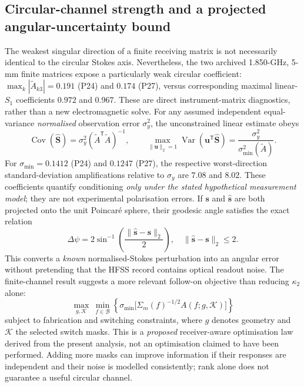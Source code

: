 \documentclass{ieeeaccess}
\begin{document}
\subsection{Circular-channel strength and a projected angular-uncertainty bound}
The weakest singular direction of a finite receiving matrix is not necessarily identical to the circular Stokes axis. Nevertheless, the two archived 1.850-GHz, 5-mm finite matrices expose a particularly weak circular coefficient: $\max_k |\widetilde A_{k3}|=0.191$ (P24) and $0.174$ (P27), versus corresponding maximal linear-$S_1$ coefficients $0.972$ and $0.967$. These are direct instrument-matrix diagnostics, rather than a new electromagnetic solve. For any assumed independent equal-variance \emph{normalised} observation error $\sigma_y^2$, the unconstrained linear estimate obeys
\begin{equation}
\operatorname{Cov}(\widehat {\boldsymbol S})=\sigma_y^2
(\widetilde A^{\mathsf T}\widetilde A)^{-1},\qquad
\max_{\|\boldsymbol u\|_2=1}\operatorname{Var}(\boldsymbol u^{\mathsf T}\widehat{\boldsymbol S})=
\frac{\sigma_y^2}{\sigma_{\min}^2(\widetilde A)}.
\label{eq:access_noise_bound}
\end{equation}
For $\sigma_{\min}=0.1412$ (P24) and $0.1247$ (P27), the respective worst-direction standard-deviation amplifications relative to $\sigma_y$ are $7.08$ and $8.02$. These coefficients quantify conditioning \emph{only under the stated hypothetical measurement model}; they are not experimental polarisation errors. If $\boldsymbol s$ and $\widehat{\boldsymbol s}$ are both projected onto the unit Poincar\'e sphere, their geodesic angle satisfies the exact relation
\begin{equation}
\Delta\psi=2\sin^{-1}\!\left(\frac{\|\widehat{\boldsymbol s}-\boldsymbol s\|_2}{2}\right),
\quad \|\widehat{\boldsymbol s}-\boldsymbol s\|_2\le 2.
\label{eq:access_angle}
\end{equation}
This converts a \emph{known} normalised-Stokes perturbation into an angular error without pretending that the HFSS record contains optical readout noise. The finite-channel result suggests a more relevant follow-on objective than reducing $\kappa_2$ alone:
\begin{equation}
\max_{g,\mathcal K}\ \min_{f\in\mathcal B}
\left\{\sigma_{\min}\big[\Sigma_m(f)^{-1/2}A(f;g,\mathcal K)\big]\right\}
\label{eq:access_design}
\end{equation}
subject to fabrication and switching constraints, where $g$ denotes geometry and $\mathcal K$ the selected switch masks. This is a \emph{proposed} receiver-aware optimisation law derived from the present analysis, not an optimisation claimed to have been performed. Adding more masks can improve information if their responses are independent and their noise is modelled consistently; rank alone does not guarantee a useful circular channel.
\end{document}
